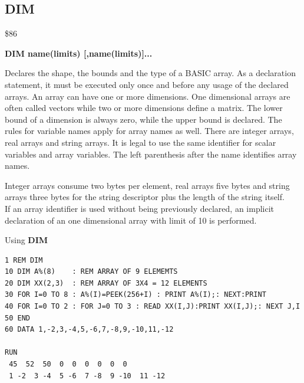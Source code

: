 \newpage
\subsection{DIM}
\begin{description}[leftmargin=2cm,style=nextline]
\item [Token:] \$86
\item [Format:] {\bf DIM name(limits) [,name(limits)]...}
\item [Usage:] Declares the shape,
               the bounds and the type of a BASIC array.
               As a declaration statement, it must be executed
               only once and before any usage of the declared arrays.
               An array can have one or more dimensions.
               One dimensional arrays are often called vectors
               while two or more dimensions define a matrix.
               The lower bound of a dimension is always zero,
               while the upper bound is declared. The rules for
               variable names apply for array names as well.
               There are integer arrays, real arrays and string arrays.
               It is legal to use the same identifier for scalar
               variables and array variables. The left parenthesis
               after the name identifies array names.

\item [Remarks:] Integer arrays consume two bytes per element,
                 real arrays five bytes and string arrays three bytes
                 for the string descriptor plus
                 the length of the string itself. \\
                 If an array identifier is used without being previously
                 declared, an implicit declaration of an
                 one dimensional array with limit of 10 is performed.

\item [Example:] Using {\bf DIM}
\begin{tcolorbox}[colback=black,coltext=white]
\verbatimfont{\codefont}
\begin{verbatim}
1 REM DIM
10 DIM A%(8)    : REM ARRAY OF 9 ELEMEMTS
20 DIM XX(2,3)  : REM ARRAY OF 3X4 = 12 ELEMENTS
30 FOR I=0 TO 8 : A%(I)=PEEK(256+I) : PRINT A%(I);: NEXT:PRINT
40 FOR I=0 TO 2 : FOR J=0 TO 3 : READ XX(I,J):PRINT XX(I,J);: NEXT J,I
50 END
60 DATA 1,-2,3,-4,5,-6,7,-8,9,-10,11,-12

RUN
 45  52  50  0  0  0  0  0  0
 1 -2  3 -4  5 -6  7 -8  9 -10  11 -12
\end{verbatim}
\end{tcolorbox}
\end{description}

